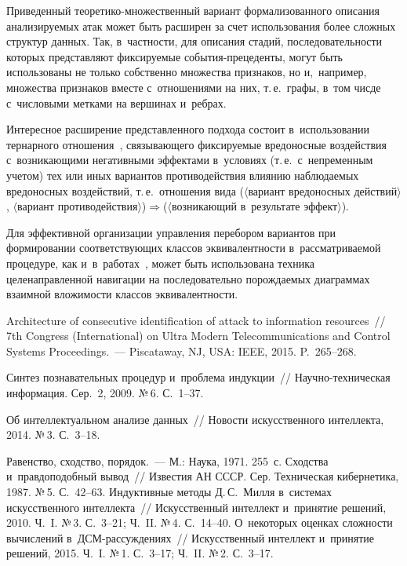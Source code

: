 \begin{multicols}{2}
  Приведенный тео\-ре\-ти\-ко-мно\-же\-ст\-вен\-ный вариант формализованного 
описания анализируемых атак может быть расширен за счет использования 
более сложных структур данных. Так, в~частности, для описания стадий, 
последовательности которых представляют фиксируемые  
со\-бы\-тия-пре\-це\-ден\-ты, могут быть использованы не только собственно 
множества признаков, но и,~например, множества признаков вместе 
с~отношениями на них, т.\,е.\ графы, в~том чисде с~числовыми метками на 
вершинах и~ребрах.
  
  Интересное расширение представленного подхода состоит в~использовании 
тернарного отношения~\cite{14-gr}, связывающего фиксируемые вредоносные 
воздействия с~возникающими негативными эффектами в~условиях (т.\,е.\ 
с~непременным учетом) тех или иных вариантов противодействия влиянию 
наблюдаемых вредоносных воздействий, т.\,е.\ отношения вида ($\langle$вариант 
вредоносных действий$\rangle$, $\langle$вариант  
про\-ти\-во\-дей\-ст\-вия$\rangle$)\;$\Rightarrow$\;($\langle$воз\-ни\-ка\-ющий 
в~результате эффект$\rangle$).
  
  Для эффективной организации управления перебором вариантов при 
формировании соответствующих классов эквивалентности в~рассматриваемой 
процедуре, как и~в~работах~\cite{12-gr, 15-gr}, может быть использована 
техника целенаправленной навигации на последовательно порождаемых 
диаграммах взаимной вложимости классов эквивалентности.

{\small\frenchspacing
 {%
 \begin{thebibliography}{99}
      Architecture of 
consecutive identification of attack to information resources~// 7th Congress (International) on Ultra 
Modern Telecommunications and Control Systems Proceedings.~--- 
Piscataway, NJ, USA: IEEE, 2015. P.~265--268.
    
      Синтез познавательных процедур и~проб\-ле\-ма
     индукции~// На\-уч\-но-тех\-ни\-че\-ская информация. Сер.~2, 2009.
     №\,6. С.~1--37.
     
      Об интеллектуальном анализе данных~// Новости искусственного 
интеллекта, 2014. №\,3. С.~3--18.

      Равенство, сходство, порядок.~--- М.: Наука, 1971. 255~с.
     \bibitem{5-gr}
      Сходства и~правдоподобный вывод~// Известия АН 
СССР. Сер. Техническая кибернетика, 1987. №\,5. С.~42--63. 
      Индуктивные методы Д.\,С.~Милля в~сис\-те\-мах искусственного 
интеллекта~// Искусственный интеллект и~принятие решений, 2010. Ч.~I. №\,3. С.~3--21; Ч.~II. 
№\,4. С.~14--40.
      О~некоторых оценках сложности вычислений  
в~ДСМ-рас\-суж\-де\-ни\-ях~// Искусственный интеллект и~принятие решений, 2015. Ч.~I. 
№\,1. С.~3--17; Ч.~II. №\,2. С.~3--17. 
    

\end{thebibliography}}}
\end{multicols}
